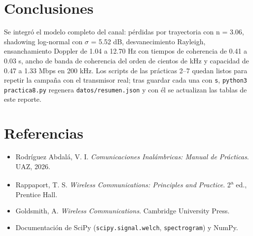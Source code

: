 \documentclass[11pt,a4paper]{article}
\begin{document}
\section{Conclusiones}

Se integró el modelo completo del canal: pérdidas por trayectoria con n = 3.06, shadowing log-normal con $\sigma$ = 5.52 dB, desvanecimiento Rayleigh, ensanchamiento Doppler de 1.04 a 12.70 Hz con tiempos de coherencia de 0.41 a 0.03 s, ancho de banda de coherencia del orden de cientos de kHz y capacidad de 0.47 a 1.33 Mbps en 200 kHz. Los scripts de las prácticas 2--7 quedan listos para repetir la campaña con el transmisor real; tras guardar cada una con \texttt{s}, \texttt{python3 practica8.py} regenera \texttt{datos/resumen.json} y con él se actualizan las tablas de este reporte.

\section{Referencias}

\begin{itemize}
  \item Rodríguez Abdalá, V. I. \emph{Comunicaciones Inalámbricas: Manual de Prácticas}. UAZ, 2026.
  \item Rappaport, T. S. \emph{Wireless Communications: Principles and Practice}. 2\textsuperscript{a} ed., Prentice Hall.
  \item Goldsmith, A. \emph{Wireless Communications}. Cambridge University Press.
  \item Documentación de SciPy (\texttt{scipy.signal.welch}, \texttt{spectrogram}) y NumPy.
\end{itemize}
\end{document}
